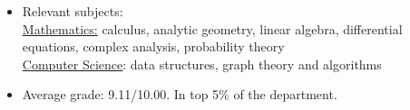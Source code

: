 \begin{itemize}
\item Relevant subjects: \\
	\underline{Mathematics:} calculus, analytic geometry, linear algebra, differential equations, complex analysis, probability theory\\
	\underline{Computer Science}: data structures, graph theory and algorithms \\
\item Average grade: 9.11/10.00. In top 5\% of the department.
\end{itemize}
